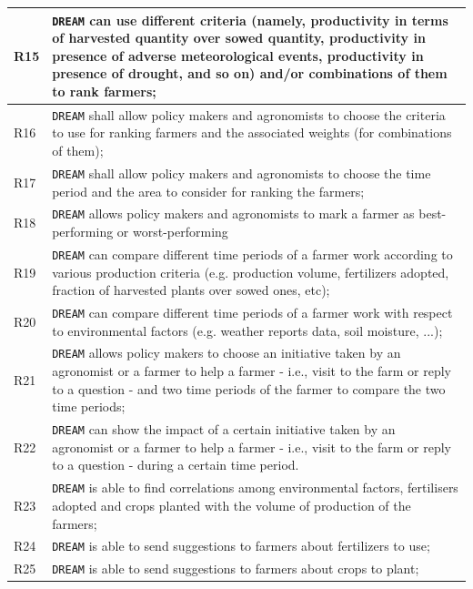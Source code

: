 \documentclass{article}
\begin{document}
\begin{longtable}[c]{|m{0.75cm}|m{11cm}|}
  \hline
R15\label{R} & \verb|DREAM| can use different criteria (namely, productivity in terms of harvested quantity over sowed quantity, productivity in presence of adverse meteorological events, productivity in presence of drought, and so on) and/or combinations of them to rank farmers;\\
  \hline
R16\label{R} & \verb|DREAM| shall allow policy makers and agronomists to choose the criteria to use for ranking farmers and the associated weights (for combinations of them);\\
  \hline
R17\label{R} & \verb|DREAM| shall allow policy makers and agronomists to choose the time period and the area to consider for ranking the farmers;\\
  \hline
  R18\label{R} & \verb|DREAM| allows policy makers and agronomists to mark a farmer as best-performing or worst-performing\\
  \hline
R19\label{R} & \verb|DREAM| can compare different time periods of a farmer work according to various production criteria (e.g. production volume, fertilizers adopted, fraction of harvested plants over sowed ones, etc);\\
  \hline
R20\label{R} & \verb|DREAM| can compare different time periods of a  farmer work with respect to environmental factors (e.g. weather reports data, soil moisture, ...);\\
  \hline
R21\label{R} & \verb|DREAM| allows policy makers to choose an initiative taken by an agronomist or a farmer to help a farmer - i.e., visit to the farm or reply to a question - and two time periods of the farmer to compare the two time periods;\\
  \hline
R22\label{R} & \verb|DREAM| can show the impact of a certain initiative taken by an agronomist or a farmer to help a farmer - i.e., visit to the farm or reply to a question - during a certain time period.\\
  \hline
  R23\label{R} & \verb|DREAM| is able to find correlations among environmental factors, fertilisers adopted and crops planted with the volume of production of the farmers;\\
  \hline
  R24\label{R} & \verb|DREAM| is able to send suggestions to farmers about fertilizers to use; \\
  \hline
  R25\label{R} & \verb|DREAM| is able to send suggestions to farmers about crops to plant; \\ 
  \hline
 

\end{longtable}
\end{document}
